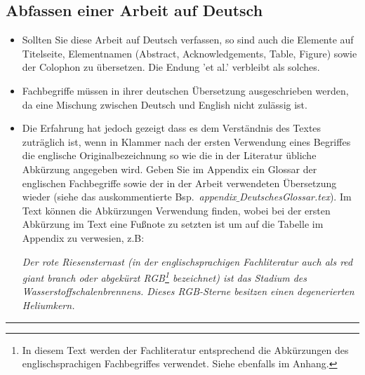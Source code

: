 \subsection*{Abfassen einer Arbeit auf Deutsch}
\begin{itemize}
    \item Sollten Sie diese Arbeit auf Deutsch verfassen, so sind auch die Elemente auf Titelseite, Elementnamen (Abstract, Acknowledgements, Table, Figure) sowie der Colophon zu übersetzen. Die Endung 'et al.' verbleibt als solches.
    
    \item Fachbegriffe müssen in ihrer deutschen Übersetzung ausgeschrieben werden, da eine Mischung zwischen Deutsch und English nicht zulässig ist. 
    
    \item Die Erfahrung hat jedoch gezeigt dass es dem Verständnis des Textes zuträglich ist, wenn in Klammer nach der ersten Verwendung eines Begriffes die englische Originalbezeichnung so wie die in der Literatur übliche Abkürzung angegeben wird.
    Geben Sie im Appendix ein Glossar der englischen Fachbegriffe sowie der in der Arbeit verwendeten Übersetzung wieder (siehe das auskommentierte Bsp.\,\textit{ appendix$\_$DeutschesGlossar.tex}). Im Text können die Abkürzungen Verwendung finden, wobei bei der ersten Abkürzung im Text eine Fußnote zu setzten ist um auf die Tabelle im Appendix zu verwesien, z.B:
    
    
    \textit{Der rote Riesensternast (in der englischsprachigen Fachliteratur auch als \textit{red giant branch} oder abgekürzt RGB\footnote{In diesem Text werden der Fachliteratur entsprechend die Abkürzungen des englischsprachigen Fachbegriffes verwendet. Siehe ebenfalls  im Anhang.} bezeichnet) ist das Stadium des Wasserstoffschalenbrennens. Dieses RGB-Sterne besitzen einen degenerierten Heliumkern.}
    
    
    
   

\end{itemize}



\begin{center}
\vspace{+5mm}
\color{ctgreenblue}\rule[10pt]{0.3\textwidth}{1pt} 
\vspace{-10mm}
\end{center}

\newpage
